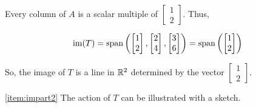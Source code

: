 \documentclass{ximera}
\begin{document}
\begin{example}
\begin{explanation}
Every column of $A$ is a scalar multiple of $\begin{bmatrix}1\\2\end{bmatrix}$.  Thus,

$$\textnormal{im}(T)=\textnormal{span}\left(\begin{bmatrix}1\\2\end{bmatrix}, \begin{bmatrix}2\\4\end{bmatrix}, \begin{bmatrix}3\\6\end{bmatrix}\right)=\textnormal{span}\left(\begin{bmatrix}1\\2\end{bmatrix}\right)$$

So, the image of $T$ is a line in $\mathbb{R}^2$ determined by the vector $\begin{bmatrix}1\\2\end{bmatrix}$.

\ref{item:impart2} The action of $T$ can be illustrated with a sketch.

\begin{image}
\centering
{}
  \label{fig:actionofst} 
\end{image}


\end{explanation}
\end{example}
\end{document}
